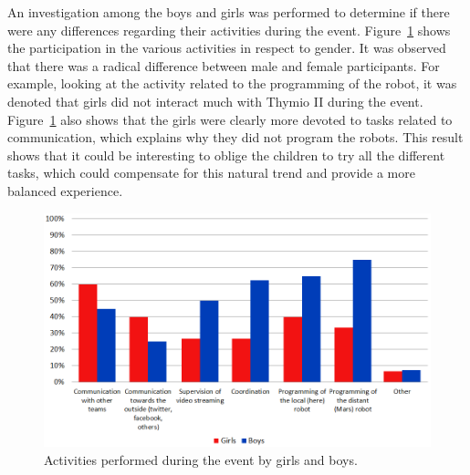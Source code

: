 \documentclass{intech-journal}
\begin{document}
An investigation among the boys and girls was performed to determine if there were any differences regarding their activities during the event.
Figure~\ref{fig:activities} shows the participation in the various activities in respect to gender. 
It was observed that there was a radical difference between male and female participants. 
For example, looking at the activity related to the programming of the robot, it was denoted that girls did not interact much with Thymio II during the event. 
Figure~\ref{fig:activities} also shows that the girls were clearly more devoted to tasks related to communication, which explains why they did not program the robots. 
This result shows that it could be interesting to oblige the children to try all the different tasks, which could compensate for this natural trend and provide a more balanced experience.

\begin{figure}[ht]
 \centering
    \includegraphics[width=0.7\columnwidth]{figures/activities.png}
  \caption{Activities performed during the event by girls and boys.}
  \label{fig:activities} 
\end{figure}
\end{document}
